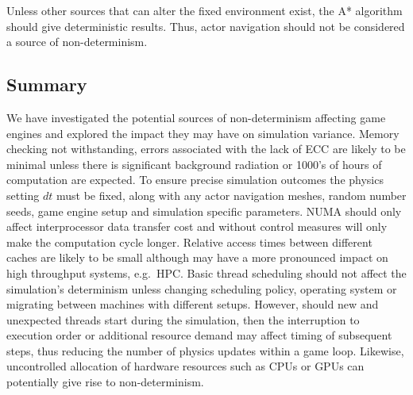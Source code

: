 \documentclass[letterpaper, 10 pt, journal, twoside]{IEEEtran}
\begin{document}
Unless other sources that can alter the fixed environment exist, the A* algorithm should give deterministic results. Thus, actor navigation should not be considered a source of non-determinism.
%
%

\subsection{Summary}
We have investigated the potential sources of non-determinism affecting game engines 
and explored the impact they may have on simulation variance. 
%
%
Memory checking not withstanding, errors associated with the lack of ECC are likely to be minimal unless there is significant background radiation or 1000's of hours of computation are expected.
%
To ensure precise simulation outcomes the physics setting $dt$ must be fixed, along with any actor navigation meshes, random number seeds, game engine setup and simulation specific parameters.
%
NUMA should only affect interprocessor data transfer cost and without control measures will only make the computation cycle longer. Relative access times between different caches are likely to be small although may have a more pronounced impact on high throughput systems, e.g.\ HPC. 
%
Basic thread scheduling should not affect the simulation's determinism unless changing scheduling policy, operating system or migrating between machines with different setups. 
%
However, should new and unexpected threads start during the simulation, then the interruption to execution order or additional resource demand may affect timing of subsequent steps, thus reducing the number of physics updates within a game loop. Likewise, uncontrolled allocation of hardware resources such as CPUs or GPUs can potentially give rise to non-determinism. 
%
\end{document}
